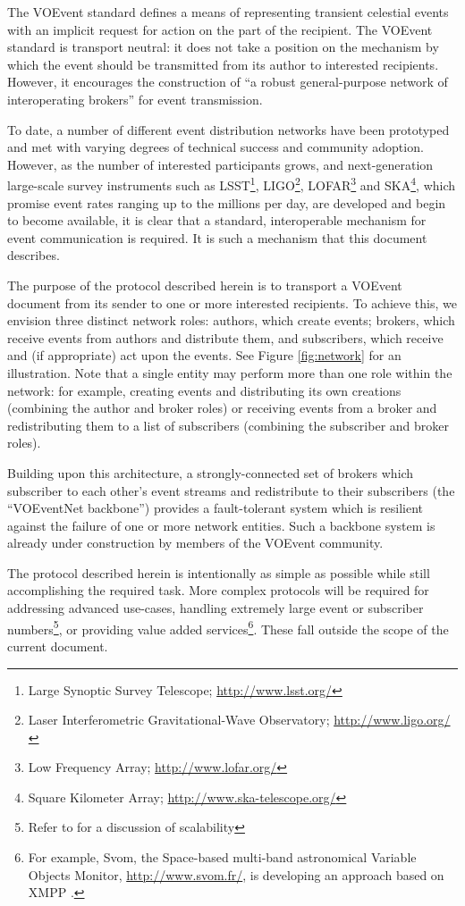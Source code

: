 \documentclass[a4paper,11pt]{ivoa}
\begin{document}
The VOEvent standard \citep{std:VOEVENT2} defines a means of representing
transient celestial events with an implicit request for action on the part of
the recipient. The VOEvent standard is transport neutral: it does not take a
position on the mechanism by which the event should be transmitted from its
author to interested recipients. However, it encourages the construction of
``a robust general-purpose network of interoperating brokers'' for event
transmission.

To date, a number of different event distribution networks have been
prototyped and met with varying degrees of technical success and community
adoption. However, as the number of interested participants grows, and
next-generation large-scale survey instruments such as LSST\footnote{Large
Synoptic Survey Telescope; \url{http://www.lsst.org/}}, LIGO\footnote{Laser
Interferometric Gravitational-Wave Observatory; \url{http://www.ligo.org/}},
LOFAR\footnote{Low Frequency Array; \url{http://www.lofar.org/}} and
SKA\footnote{Square Kilometer Array; \url{http://www.ska-telescope.org/}},
which promise event rates ranging up to the millions per day, are
developed and begin to become available, it is clear that a standard,
interoperable mechanism for event communication is required. It is such a
mechanism that this document describes.

The purpose of the protocol described herein is to transport a VOEvent
document from its sender to one or more interested recipients. To achieve
this, we envision three distinct network roles: authors, which create events;
brokers, which receive events from authors and distribute them, and
subscribers, which receive and (if appropriate) act upon the events. See
Figure \ref{fig:network} for an illustration. Note that a single entity may
perform more than one role within the network: for example, creating events
and distributing its own creations (combining the author and broker roles) or
receiving events from a broker and redistributing them to a list of
subscribers (combining the subscriber and broker roles).

Building upon this architecture, a strongly-connected set of brokers which
subscriber to each other's event streams and redistribute to their subscribers
(the ``VOEventNet backbone'') provides a fault-tolerant system which is
resilient against the failure of one or more network entities. Such a backbone
system is already under construction by members of the VOEvent community.

The protocol described herein is intentionally as simple as possible while
still accomplishing the required task. More complex protocols will be required
for addressing advanced use-cases, handling extremely large event or
subscriber numbers\footnote{Refer to \citet{Swinbank:2014} for a discussion of
scalability}, or providing value added services\footnote{For example, Svom,
the Space-based multi-band astronomical Variable Objects Monitor,
\url{http://www.svom.fr/}, is developing an approach based on XMPP
\citep{SaintAndre:2011}.}. These fall outside the scope of the current
document.
\end{document}
